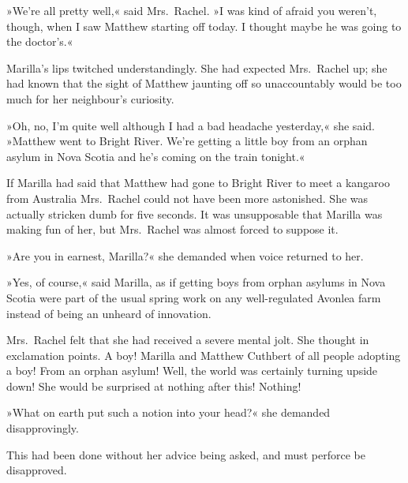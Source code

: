 »We're all pretty well,« said Mrs.~Rachel. »I was kind of afraid you weren't, though, when I saw Matthew starting off today. I thought maybe he was going to the doctor's.«

Marilla's lips twitched understandingly. She had expected Mrs.~Rachel up; she had known that the sight of Matthew jaunting off so unaccountably would be too much for her neighbour's curiosity.

»Oh, no, I'm quite well although I had a bad headache yesterday,« she said. »Matthew went to Bright River. We're getting a little boy from an orphan asylum in Nova Scotia and he's coming on the train tonight.«

If Marilla had said that Matthew had gone to Bright River to meet a kangaroo from Australia Mrs.~Rachel could not have been more astonished. She was actually stricken dumb for five seconds. It was unsupposable that Marilla was making fun of her, but Mrs.~Rachel was almost forced to suppose it.

»Are you in earnest, Marilla?« she demanded when voice returned to her.

»Yes, of course,« said Marilla, as if getting boys from orphan asylums in Nova Scotia were part of the usual spring work on any well-regulated Avonlea farm instead of being an unheard of innovation.

Mrs.~Rachel felt that she had received a severe mental jolt. She thought in exclamation points. A boy! Marilla and Matthew Cuthbert of all people adopting a boy! From an orphan asylum! Well, the world was certainly turning upside down! She would be surprised at nothing after this! Nothing!

»What on earth put such a notion into your head?« she demanded disapprovingly.

This had been done without her advice being asked, and must perforce be disapproved.

